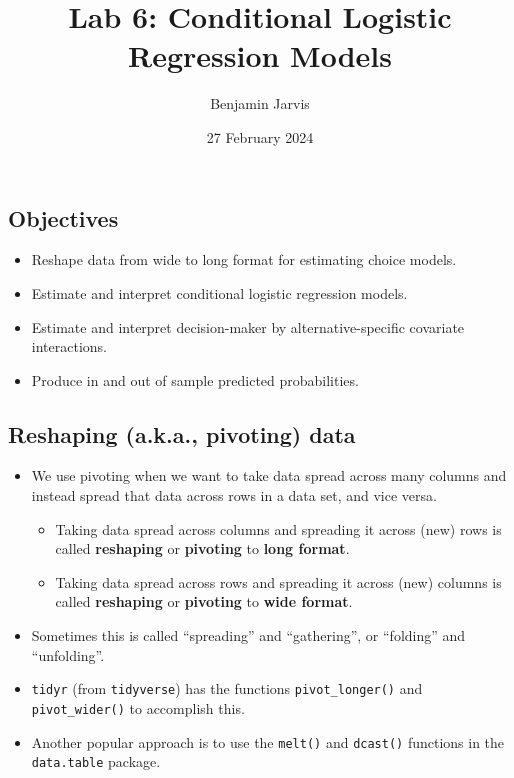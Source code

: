 \documentclass[
  11pt,
]{article}
\title{Lab 6: Conditional Logistic Regression Models}
\author{Benjamin Jarvis}
\date{27 February 2024}
\begin{document}
\maketitle

\hypertarget{objectives}{%
\subsection{Objectives}\label{objectives}}

\begin{itemize}
\item
  Reshape data from wide to long format for estimating choice models.
\item
  Estimate and interpret conditional logistic regression models.
\item
  Estimate and interpret decision-maker by alternative-specific
  covariate interactions.
\item
  Produce in and out of sample predicted probabilities.
\end{itemize}

\hypertarget{reshaping-a.k.a.-pivoting-data}{%
\subsection{Reshaping (a.k.a., pivoting)
data}\label{reshaping-a.k.a.-pivoting-data}}

\begin{itemize}
\item
  We use pivoting when we want to take data spread across many columns
  and instead spread that data across rows in a data set, and vice
  versa.

  \begin{itemize}
  \item
    Taking data spread across columns and spreading it across (new) rows
    is called \textbf{reshaping} or \textbf{pivoting} to \textbf{long
    format}.
  \item
    Taking data spread across rows and spreading it across (new) columns
    is called \textbf{reshaping} or \textbf{pivoting} to \textbf{wide
    format}.
  \end{itemize}
\item
  Sometimes this is called ``spreading'' and ``gathering'', or
  ``folding'' and ``unfolding''.
\item
  \texttt{tidyr} (from \texttt{tidyverse}) has the functions
  \texttt{pivot\_longer()} and \texttt{pivot\_wider()} to accomplish
  this.
\item
  Another popular approach is to use the \texttt{melt()} and
  \texttt{dcast()} functions in the \texttt{data.table} package.
\end{itemize}
\end{document}

